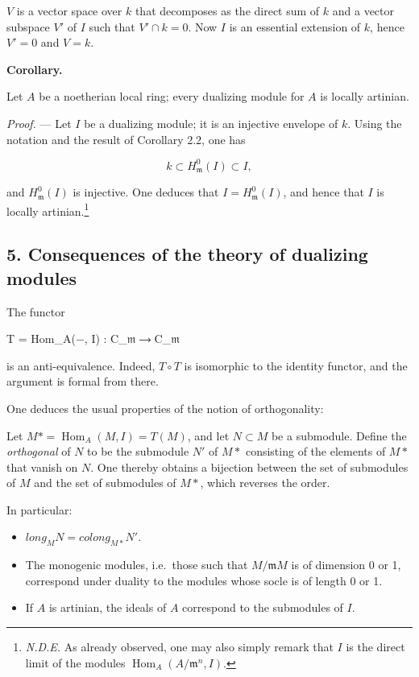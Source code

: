 \documentclass[
]{article}
\newenvironment{Shaded}{}{}
\newcommand{\NormalTok}[1]{#1}
\providecommand{\tightlist}{%
  \setlength{\itemsep}{0pt}\setlength{\parskip}{0pt}}
\begin{document}
\(V\) is a vector space over \(k\) that decomposes as the direct sum of
\(k\) and a vector subspace \(V'\) of \(I\) such that \(V' \cap k = 0\).
Now \(I\) is an essential extension of \(k\), hence \(V' = 0\) and
\(V = k\).

\textbf{Corollary.}

Let \(A\) be a noetherian local ring; every dualizing module for \(A\)
is locally artinian.

\emph{Proof.} --- Let \(I\) be a dualizing module; it is an injective
envelope of \(k\). Using the notation and the result of Corollary 2.2,
one has

\[
k \subset H^{0}_{\mathfrak{m}}(I) \subset I,
\]

and \(H^{0}_{\mathfrak{m}}(I)\) is injective. One deduces that
\(I = H^{0}_{\mathfrak{m}}(I)\), and hence that \(I\) is locally
artinian.\footnote{\emph{N.D.E.} As already observed, one may also
  simply remark that \(I\) is the direct limit of the modules
  \(\operatorname{Hom}_{A}(A/\mathfrak{m}^{n}, I)\).}

\subsection{5. Consequences of the theory of dualizing
modules}\label{consequences-of-the-theory-of-dualizing-modules}

The functor

\begin{Shaded}
\begin{Highlighting}[]
\NormalTok{T = Hom\_A(−, I) : C\_𝔪 ⟶ C\_𝔪}
\end{Highlighting}
\end{Shaded}

is an anti-equivalence. Indeed, \(T \circ T\) is isomorphic to the
identity functor, and the argument is formal from there.

One deduces the usual properties of the notion of orthogonality:

Let \(M* = \operatorname{Hom}_{A}(M, I) = T(M)\), and let
\(N \subset M\) be a submodule. Define the \emph{orthogonal} of \(N\) to
be the submodule \(N'\) of \(M*\) consisting of the elements of \(M*\)
that vanish on \(N\). One thereby obtains a bijection between the set of
submodules of \(M\) and the set of submodules of \(M*\), which reverses
the order.

In particular:

\begin{itemize}
\tightlist
\item
  \(long_{M} N = colong_{M*} N'\).
\item
  The monogenic modules, i.e.~those such that \(M/\mathfrak{m}M\) is of
  dimension 0 or 1, correspond under duality to the modules whose socle
  is of length 0 or 1.
\item
  If \(A\) is artinian, the ideals of \(A\) correspond to the submodules
  of \(I\).
\end{itemize}
\end{document}

